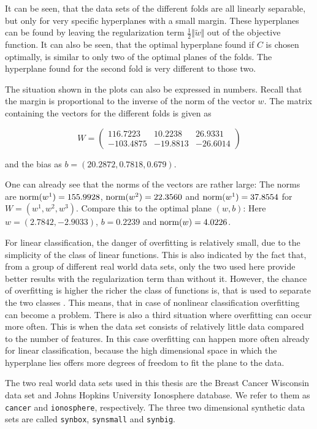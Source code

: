 It can be seen, that the data sets of the different folds are all linearly separable, but only for very specific hyperplanes with a small margin.
These hyperplanes can be found by leaving the regularization term \(\frac{1}{2}\Vert \tilde{w}\Vert\) out of the objective function.
It can also be seen, that the optimal hyperplane found if \(C\) is chosen optimally, is similar to only two of the optimal planes of the folds. The hyperplane found for the second fold is very different to those two.

The situation shown in the plots can also be expressed in numbers. Recall that the margin is proportional to the inverse of the norm of the vector \(w\). The matrix containing the vectors for the different folds is given as

\[ W = \begin{pmatrix} 116.7223 & 10.2238 & 26.9331 \\
                      -103.4875 & -19.8813& -26.6014\end{pmatrix}\]

and the bias as \(b = ( 20.2872, 0.7818, 0.679)\).
											
One can already see that the norms of the vectors are rather large: The norms are \(\textup{norm}(w^1)= 155.9928\), \(\textup{norm}(w^2)= 22.3560\) and \(\textup{norm}(w^1)= 37.8554\) for \(W = (w^{1},w^2,w^3)\).
Compare this to the optimal plane \((w,b)\): Here \(w = (2.7842, -2.9033)\), \(b =0.2239\) and \(\textup{norm}(w)=4.0226\).

For linear classification, the danger of overfitting is relatively small, due to the simplicity of the class of linear functions. This is also indicated by the fact that, from a group of different real world data sets, only the two used here provide better results with the regularization term than without it.
However, the chance of overfitting is higher the richer the class of functions is, that is used to separate the two classes \cite[p. 2-4]{Kunapuli2008}. This means, that in case of nonlinear classification overfitting can become a problem. 
There is also a third situation where overfitting can occur more often. This is when the data set consists of relatively little data compared to the number of features. In this case overfitting can happen more often already for linear classification, because the high dimensional space in which the hyperplane lies offers more degrees of freedom to fit the plane to the data.

The two real world data sets used in this thesis are the Breast Cancer Wisconsin data set and Johns Hopkins University Ionosphere database. We refer to them as \texttt{cancer} and \texttt{ionosphere}, respectively.
The three two dimensional synthetic data sets are called \texttt{synbox}, \texttt{synsmall} and \texttt{synbig}.

